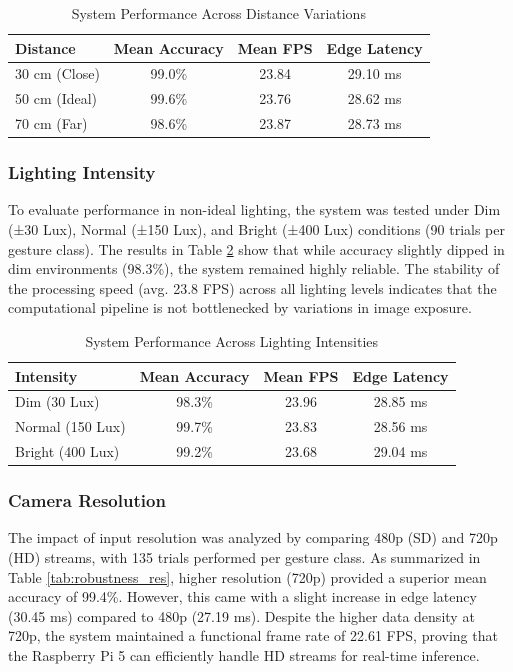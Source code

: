 \begin{table}[htbp]
\caption{System Performance Across Distance Variations}
\label{tab:robustness_distance}
\centering
\begin{tabular}{l c c c}
\hline
\hline
\textbf{Distance} & \textbf{Mean Accuracy} & \textbf{Mean FPS} & \textbf{Edge Latency} \\
\hline
30 cm (Close) & 99.0\% & 23.84 & 29.10 ms \\
50 cm (Ideal) & 99.6\% & 23.76 & 28.62 ms \\
70 cm (Far)   & 98.6\% & 23.87 & 28.73 ms \\
\hline
\end{tabular}
\end{table}

\subsubsection{Lighting Intensity}
To evaluate performance in non-ideal lighting, the system was tested under Dim (±30 Lux), Normal (±150 Lux), and Bright (±400 Lux) conditions (90 trials per gesture class). The results in Table \ref{tab:robustness_light} show that while accuracy slightly dipped in dim environments (98.3\%), the system remained highly reliable. The stability of the processing speed (avg. 23.8 FPS) across all lighting levels indicates that the computational pipeline is not bottlenecked by variations in image exposure.

\begin{table}[htbp]
\caption{System Performance Across Lighting Intensities}
\label{tab:robustness_light}
\centering
\begin{tabular}{l c c c}
\hline
\hline
\textbf{Intensity} & \textbf{Mean Accuracy} & \textbf{Mean FPS} & \textbf{Edge Latency} \\
\hline
Dim (30 Lux)    & 98.3\% & 23.96 & 28.85 ms \\
Normal (150 Lux) & 99.7\% & 23.83 & 28.56 ms \\
Bright (400 Lux) & 99.2\% & 23.68 & 29.04 ms \\
\hline
\end{tabular}
\end{table}

\subsubsection{Camera Resolution}
The impact of input resolution was analyzed by comparing 480p (SD) and 720p (HD) streams, with 135 trials performed per gesture class. As summarized in Table \ref{tab:robustness_res}, higher resolution (720p) provided a superior mean accuracy of 99.4\%. However, this came with a slight increase in edge latency (30.45 ms) compared to 480p (27.19 ms). Despite the higher data density at 720p, the system maintained a functional frame rate of 22.61 FPS, proving that the Raspberry Pi 5 can efficiently handle HD streams for real-time inference.

